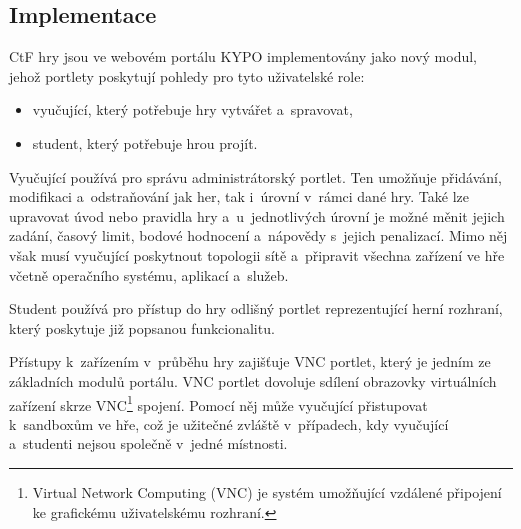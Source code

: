 \documentclass[
  digital, %
  oneside, %
  table,   %
  nolof,     %
  nolot,     %
  nocover
]{fithesis3}
\begin{document}
\subsection{Implementace}
CtF hry jsou ve webovém portálu KYPO implementovány jako nový modul, jehož portlety poskytují pohledy pro tyto uživatelské role:
\begin{itemize}
  \item vyučující, který potřebuje hry vytvářet a~spravovat,
  \item student, který potřebuje hrou projít.
\end{itemize}
Vyučující používá pro správu administrátorský portlet. Ten umožňuje přidávání, modifikaci a~odstraňování jak her, tak i~úrovní v~rámci dané hry. Také lze upravovat úvod nebo pravidla hry a~u~jednotlivých úrovní je možné měnit jejich zadání, časový limit, bodové hodnocení a~nápovědy s~jejich penalizací. Mimo něj však musí vyučující poskytnout topologii sítě a~připravit všechna zařízení ve hře včetně operačního systému, aplikací a~služeb. \cite{ctfDesign, Dankovcikova2015thesis}\par
Student používá pro přístup do hry odlišný portlet reprezentující herní rozhraní, který poskytuje již popsanou funkcionalitu.\par
Přístupy k~zařízením v~průběhu hry zajišťuje VNC portlet, který je jedním ze základních modulů portálu. VNC portlet dovoluje sdílení obrazovky virtuálních zařízení skrze VNC\footnote{Virtual Network Computing (VNC) je systém umožňující vzdálené připojení ke grafickému uživatelskému rozhraní.} spojení. Pomocí něj může vyučující přistupovat k~sandboxům ve hře, což je užitečné zvláště v~případech, kdy vyučující a~studenti nejsou společně v~jedné místnosti. \cite{ctfDesign}
\end{document}
